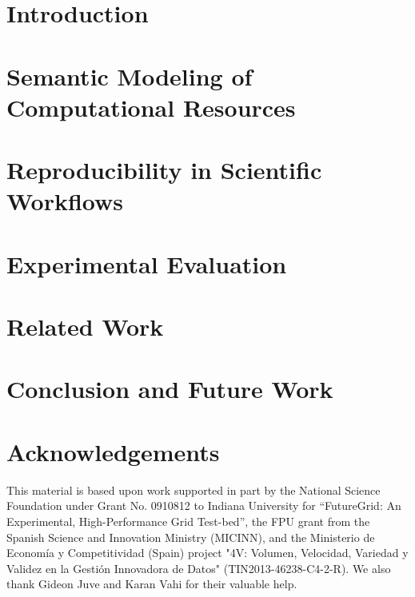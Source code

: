 \documentclass[final,5p,times,twocolumn]{elsarticle}
\begin{document}
\section{Introduction}



\section{Semantic Modeling of Computational Resources}
\label{sec:semantic}



\section{Reproducibility in Scientific Workflows}
\label{sec:reproducibility}



\section{Experimental Evaluation}
\label{sec:experiment}



\section{Related Work}
\label{sec:related-work}



\section{Conclusion and Future Work}
\label{sec:conclusion}



\section*{Acknowledgements}

This material is based upon work supported in part by the National Science Foundation under Grant No. 0910812 to Indiana University for ``FutureGrid: An Experimental, High-Performance Grid Test-bed'', the FPU grant from the Spanish Science and Innovation Ministry (MICINN), and the Ministerio de Econom\'ia y Competitividad (Spain) project "4V: Volumen, Velocidad, Variedad y Validez en la Gesti\'on Innovadora de Datos" (TIN2013-46238-C4-2-R). We also thank Gideon Juve and Karan Vahi for their valuable help.




\end{document}
